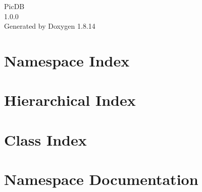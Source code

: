 \documentclass[twoside]{book}
\newcommand{\+}{\discretionary{\mbox{\scriptsize$\hookleftarrow$}}{}{}}
\newcommand{\clearemptydoublepage}{%
  \newpage{\pagestyle{empty}\cleardoublepage}%
}
\begin{document}
\hypersetup{pageanchor=false,
             bookmarksnumbered=true,
             pdfencoding=unicode
            }
\begin{titlepage}
\vspace*{7cm}
\begin{center}%
{\Large Pic\+DB \\[1ex]\large 1.\+0.\+0 }\\
\vspace*{1cm}
{\large Generated by Doxygen 1.8.14}\\
\end{center}
\end{titlepage}
\clearemptydoublepage
{}
\tableofcontents
\clearemptydoublepage
{}
\hypersetup{pageanchor=true}

\chapter{Namespace Index}

\chapter{Hierarchical Index}

\chapter{Class Index}

\chapter{Namespace Documentation}









\end{document}
